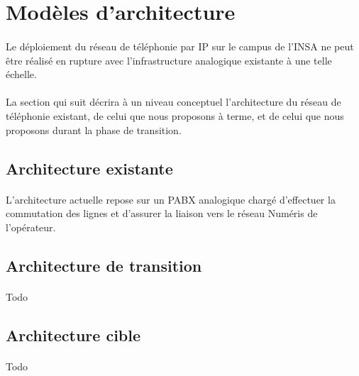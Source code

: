 \section{Modèles d'architecture}

\paragraph{} Le déploiement du réseau de téléphonie par IP sur le campus de
l'INSA ne peut être réalisé en rupture avec l'infrastructure analogique
existante à une telle échelle.
\paragraph{} La section qui suit décrira à un niveau conceptuel l'architecture
du réseau de téléphonie existant, de celui que nous proposons à terme, et de
celui que nous proposons durant la phase de transition.

\subsection{Architecture existante}
\paragraph{} L'architecture actuelle repose sur un PABX analogique chargé
d'effectuer la commutation des lignes et d'assurer la liaison vers le réseau
Numéris de l'opérateur.

\subsection{Architecture de transition}
\paragraph{} Todo

\subsection{Architecture cible}
\paragraph{} Todo

